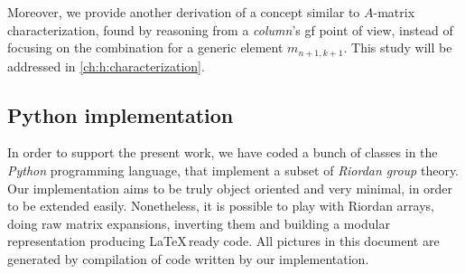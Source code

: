 Moreover, we provide another derivation of a concept similar to $A$-matrix characterization,
found by reasoning from a \emph{column}'s \ac{gf} point of view, instead of
focusing on the combination for a generic element $m_{n+1,k+1}$. This study will be
addressed in \autoref{ch:h:characterization}.

\subsection{Python implementation}

In order to support the present work, we have coded a bunch of classes in the
\emph{Python} programming language, that implement a subset of \emph{Riordan group}
theory. Our implementation aims to be truly object oriented and very minimal,
in order to be extended easily. Nonetheless, it is possible to play with Riordan arrays,
doing raw matrix expansions, inverting them and building a modular representation
producing \LaTeX\,ready code. All pictures in this document are generated by compilation
of code written by our implementation.

